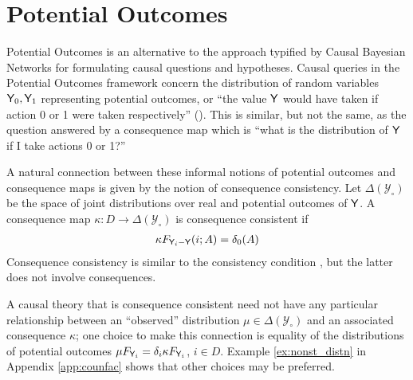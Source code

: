 
\section{Potential Outcomes}

Potential Outcomes is an alternative to the approach typified by Causal Bayesian Networks for formulating causal questions and hypotheses. Causal queries in the Potential Outcomes framework concern the distribution of random variables $\mathsf{Y}_0, \mathsf{Y}_1$ representing potential outcomes, or ``the value $\mathsf{Y}$ would have taken if action 0 or 1 were taken respectively'' (\cite{hernan_causal_2018}). This is similar, but not the same, as the question answered by a consequence map which is ``what is the distribution of $\mathsf{Y}$ if I take actions 0 or 1?''

A natural connection between these informal notions of potential outcomes and consequence maps is given by the notion of consequence consistency. Let $\Delta(\mathcal{Y}_\circ)$ be the space of joint distributions over real and potential outcomes of $\mathsf{Y}$. A consequence map $\kappa:D\to \Delta(\mathcal{Y}_\circ)$ is consequence consistent if
\begin{align}
    \kappa F_{\mathsf{Y}_i-\mathsf{Y}} (i;A)=\delta_0(A) \label{eq:oc_consist}
\end{align} 
Consequence consistency is similar to the consistency condition \citep{richardson2013single}, but the latter does not involve consequences.

A causal theory that is consequence consistent need not have any particular relationship between an ``observed'' distribution $\mu\in \Delta(\mathcal{Y}_\circ)$ and an associated consequence $\kappa$; one choice to make this connection is equality of the distributions of potential outcomes $\mu F_{\mathsf{Y}_i} = \delta_i \kappa F_{\mathsf{Y}_i}$, $i\in D$. Example \ref{ex:nonst_distn} in Appendix \ref{app:counfac} shows that other choices may be preferred.


